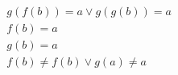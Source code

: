 \begin{align*}
%
& g(f(b)) = a \lor g(g(b)) = a
~\\~
& f(b) = a
~\\~
& g(b) = a
~\\~
& f(b)  \neq  f(b) \lor g(a)  \neq  a
%
\end{align*}
